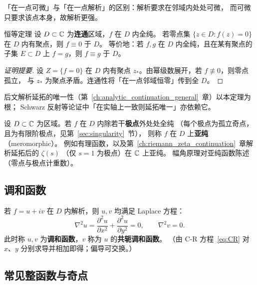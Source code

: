 「在一点可微」与「在一点解析」的区别：解析要求在邻域内处处可微，
而可微只要求该点本身，故解析更强。

\begin{theorem}[breakable=false]{恒等定理}{}
\label{thm:identity}
设 $D\subset\mathbb{C}$ 为\textbf{连通}区域，$f$ 在 $D$ 内全纯。
若零点集 $\{z\in D:f(z)=0\}$ 在 $D$ 内有聚点，则 $f\equiv 0$ 于 $D$。
等价地：若 $f,g$ 在 $D$ 内全纯，且在某有聚点的子集 $E\subset D$ 上 $f=g$，则 $f\equiv g$ 于 $D$。
\end{theorem}

\begin{proof}[证明提要]
设 $Z=\{f=0\}$ 在 $D$ 内有聚点 $z_*$。由幂级数展开，若 $f\not\equiv 0$，则零点孤立，
与 $z_*$ 为聚点矛盾。连通性将「在一点邻域恒零」传到全 $D$。
\end{proof}

后文解析延拓的唯一性（第~\ref{ch:analytic_continuation_general}~章）以本定理为根；
Schwarz 反射等论证中「在实轴上一致则延拓唯一」亦依赖它。

\label{def:meromorphic}
设 $D\subset\mathbb{C}$ 为区域。若 $f$ 在 $D$ 内除若干\textbf{极点}外处处全纯
（每个极点为孤立奇点，且为有限阶极点，见第~\ref{sec:singularity}~节），
则称 $f$ 在 $D$ 上\textbf{亚纯}（meromorphic）。
例如有理函数，以及第~\ref{ch:riemann_zeta_continuation}~章解析延拓后的 $\zeta(s)$
（仅 $s=1$ 为极点）在 $\mathbb{C}$ 上亚纯。
幅角原理对亚纯函数陈述（零点与极点计重数）。

\subsection{调和函数}

\label{thm:harmonic}
若 $f=u+iv$ 在 $D$ 内解析，则 $u,v$ 均满足 Laplace 方程：
\begin{equation}
  \nabla^2 u = \frac{\partial^2 u}{\partial x^2}+\frac{\partial^2 u}{\partial y^2}=0,
  \qquad
  \nabla^2 v = 0.
  \label{eq:laplace}
\end{equation}
此时称 $u,v$ 为\textbf{调和函数}，$v$ 称为 $u$ 的\textbf{共轭调和函数}。
（由 C-R 方程~\eqref{eq:CR} 对 $x$、$y$ 分别求导并相加即得；偏导可交换。）

\subsection{常见整函数与奇点}

